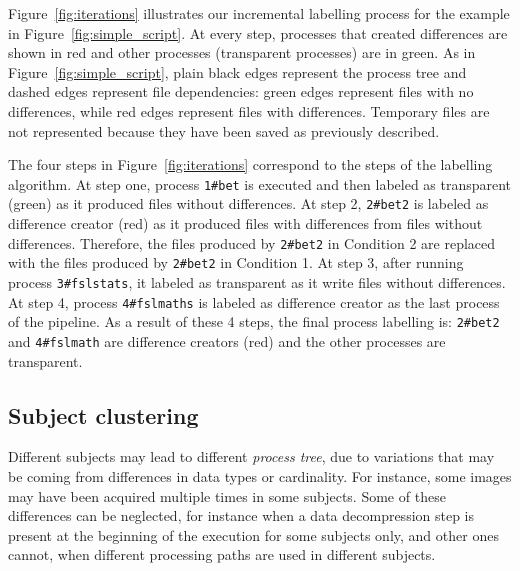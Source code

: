 \documentclass[a4paper,num-refs]{oup-contemporary}
\begin{document}
Figure~\ref{fig:iterations} illustrates our incremental labelling 
process for the example in Figure~\ref{fig:simple_script}. At every 
step, processes that created differences are shown in red and other processes 
(transparent processes) are in green. As in 
Figure~\ref{fig:simple_script}, plain black edges represent the process 
tree and dashed edges represent file dependencies: green edges 
represent files with no differences, while red edges represent files with 
differences. Temporary files are not represented because they have been 
saved as previously described.

The four steps in Figure~\ref{fig:iterations} correspond to the 
steps of the labelling algorithm. 
At step one, process \texttt{1\#bet} is executed and then labeled 
as transparent (green) as it produced files without differences.
At step 2, \texttt{2\#bet2} 
is labeled as difference creator (red) as it produced files with differences 
from files without differences. Therefore, the files produced by \texttt{2\#bet2} in  
Condition 2 are replaced with the files produced by \texttt{2\#bet2} in 
Condition 1.
At step 3, after running process \texttt{3\#fslstats}, it labeled as 
transparent as it write files without differences.
At step 4, process \texttt{4\#fslmaths} is labeled as difference creator 
as the last process of the pipeline.
As a result of these 4 steps, the final process labelling is: 
\texttt{2\#bet2} and \texttt{4\#fslmath} are difference creators (red) 
and the other processes are transparent.


\subsection{Subject clustering}

Different subjects may lead to different \emph{process tree}, due to
variations that may be coming from differences in data types or
cardinality. For instance, some images may have been acquired multiple
times in some subjects. Some of these differences can be neglected, for
instance when a data decompression step is present at the beginning of the
execution for some subjects only, and other ones cannot, when different
processing paths are used in different subjects.
\end{document}

